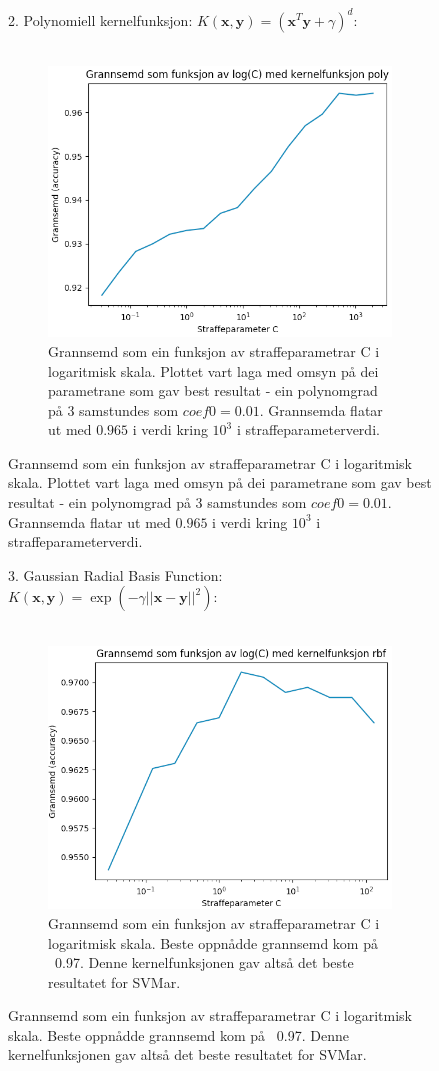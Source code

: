 \documentclass[oneside, nynorsk]{book}
\begin{document}
\begin{figure}[h!]
  2. Polynomiell kernelfunksjon: $K(\boldsymbol{x},\boldsymbol{y})=(\boldsymbol{x}^T\boldsymbol{y}+\gamma)^d$: \\\\
  \begin{subfigure}{\textwidth}
        \centering
        \centerline{\includegraphics[width=0.7\linewidth]{poly}}
        \caption{Grannsemd som ein funksjon av straffeparametrar C i logaritmisk skala. Plottet vart laga med omsyn på dei parametrane som gav best resultat - ein polynomgrad på 3 samstundes som $coef0=0.01$.
         Grannsemda flatar ut med $0.965$ i verdi kring $10^3$ i straffeparameterverdi.}
        \label{poly}
    \end{subfigure}
\end{figure}

\begin{figure}[h!]
  3. Gaussian Radial Basis Function: $K(\boldsymbol{x},\boldsymbol{y})=\exp{\left(-\gamma\vert\vert\boldsymbol{x}-\boldsymbol{y}\vert\vert^2\right)}$: \\\\
  \begin{subfigure}{\textwidth}
        \centering
        \centerline{\includegraphics[width=0.7\linewidth]{rbf}}
        \caption{Grannsemd som ein funksjon av straffeparametrar C i logaritmisk skala. Beste oppnådde grannsemd kom på ~0.97. Denne kernelfunksjonen gav altså det beste resultatet for SVMar.}
        \label{rbf}
    \end{subfigure}
\end{figure}
\end{document}
